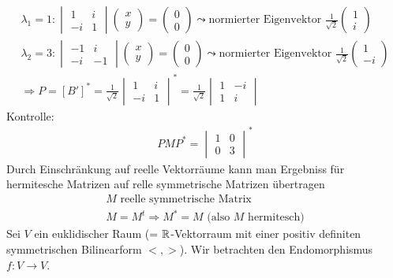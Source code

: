 \begin{align}
\lambda_1 = 1: \begin{vmatrix} 1 & i \\ -i & 1 \end{vmatrix} \begin{pmatrix} x \\ y\end{pmatrix} = \begin{pmatrix} 0 \\ 0 \end{pmatrix} \leadsto \text{normierter Eigenvektor } \frac{1}{\sqrt{2}} \begin{pmatrix} 1 \\ i \end{pmatrix} \\
\lambda_2 = 3: \begin{vmatrix} -1 & i \\ -i & -1 \end{vmatrix} \begin{pmatrix} x \\ y\end{pmatrix} = \begin{pmatrix} 0 \\ 0 \end{pmatrix} \leadsto \text{normierter Eigenvektor } \frac{1}{\sqrt{2}} \begin{pmatrix} 1 \\ -i \end{pmatrix} \\
\Rightarrow P = [B']^{*} = \frac{1}{\sqrt{2}} \begin{vmatrix} 1 & i \\ -i & 1 \end{vmatrix}^{*} = \frac{1}{\sqrt{2}} \begin{vmatrix} 1 & -i \\ 1 & i \end{vmatrix}
\end{align}
Kontrolle:
\begin{align}
PMP^{*} = \begin{vmatrix} 1 & 0 \\ 0 & 3 \end{vmatrix}^{*}
\end{align}
Durch Einschränkung auf reelle Vektorräume kann man Ergebniss für hermitesche Matrizen auf relle symmetrische Matrizen übertragen 
\begin{align}
M \text{ reelle symmetrische Matrix} \\
M= M^t \Rightarrow M^{*} = M \text{ (also $M$ hermitesch)}
\end{align}
Sei $V$ ein euklidischer Raum (= $\mathbb{R}$-Vektorraum mit einer positiv definiten symmetrischen Bilinearform $<, >$). Wir betrachten den Endomorphismus $f: V \rightarrow V$.

